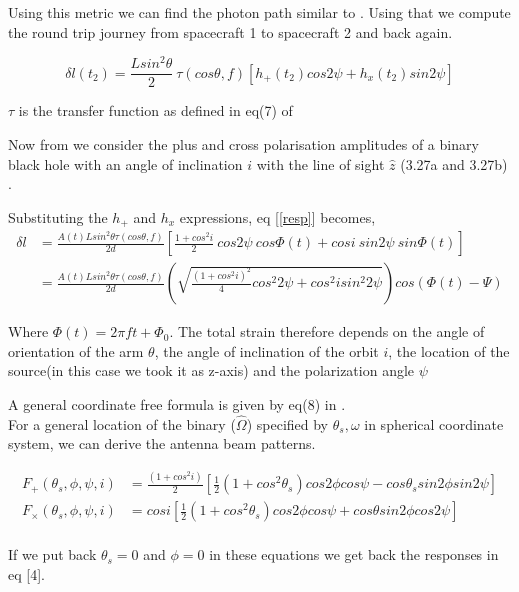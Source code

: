 \documentclass[10pt,a4paper]{article}
\begin{document}
Using this metric we can  find the photon path similar to \cite{cornish}. Using that we compute the round trip journey from spacecraft 1 to spacecraft 2 and back again. 

\begin{equation}
\label{resp}
\delta l(t_2) = \frac{L sin^2 \theta}{2} \ \tau(cos \theta,f) \left[ h_{+}(t_2) cos 2\psi + h_{x}(t_2) sin 2\psi \right]
\end{equation}

$\tau$ is the transfer function as defined in eq(7) of \cite{cornish}

Now from we consider the plus and cross polarisation amplitudes of a binary black hole with an angle of inclination $i$ with the line of sight $\hat{z}$ (3.27a and 3.27b) \cite{whelan}. 

Substituting the $h_{+}$ and $h_{x}$ expressions, eq [\ref{resp}] becomes,
\begin{align}
\delta l&=\frac{A(t) L sin^2 \theta \tau(cos \theta,f)}{2d} \left[\frac{1+cos^2 i}{2} \ cos 2\psi \ cos \Phi(t) + cos i \ sin 2\psi \ sin \Phi(t)\right]\\
&=\frac{A(t) L sin^2 \theta \tau(cos \theta,f)}{2d} \left( \sqrt{ \frac{(1+cos^2 i)^2}{4} cos^2 2\psi  + cos^2 i sin^2 2\psi} \right)cos(\Phi(t)-\Psi)
\end{align}

Where $\Phi(t) = 2 \pi f t + \Phi_0$.
The total strain therefore depends on the angle of orientation of the arm $\theta$, the angle of inclination of the orbit $i$, the location of the source(in this case we took it as z-axis) and the polarization angle $\psi$

A general coordinate free formula is given by eq(8) in \cite{cornish}.\\
 

For a general location of the binary ($\hat{\Omega}$) specified by $\theta_s,\omega$ in spherical coordinate system, we can derive the antenna beam patterns.\cite{whelan}

\begin{align*}
F_{+}(\theta_s,\phi,\psi,i)&=\frac{(1+cos^2 i)}{2} \left[\frac{1}{2}(1+ cos^2 \theta_s) cos2\phi cos\psi - cos\theta_s sin2\phi sin2\psi \right]\\
F_{\times}(\theta_s,\phi,\psi,i)&=cos i \left[\frac{1}{2}(1+ cos^2 \theta_s) cos2\phi cos\psi + cos\theta sin2\phi cos2\psi \right]\\ 
\end{align*}

If we put back $\theta_s=0$ and $\phi=0$ in these equations we get back the responses in eq [4].
\end{document}
